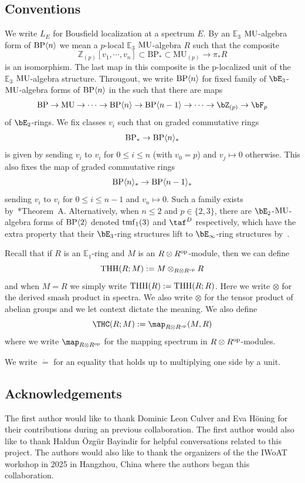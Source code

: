 \subsection{Conventions}
We write $L_{E}$ for Bousfield localization at a spectrum $E$. By an $
\mathbb{E}_{3}$ $\mathrm{MU}$-algebra form of $\mathrm{BP}\langle n\rangle$ we mean a $p$-local $\mathbb{E}_{3}$ $\mathrm{MU}$-algebra $R$ such that
the composite
\[ \mathbb{Z}_{(p)}[v_1,\cdots ,v_n]\subset \mathrm{BP}_*\subset \mathrm{MU}_{(p)}\to \pi_*R
\]
is an isomorphism. The last map in this composite is the p-localized unit of the $\mathbb{E}_3$ $\mathrm{MU}$-algebra
structure. Througout, we write $\mathrm{BP}\langle n\rangle$ for fixed family of $\bE_3$-$\mathrm{MU}$-algebra forms of $\mathrm{BP}\langle n\rangle$ in the such that there are maps
\[
\BP\to \MU \to  \dots \to \BP\langle n\rangle\to  \BP\langle n-1\rangle\to  \dots  \to \bZ_{(p)}\to \bF_{p}
\]
of $\bE_2$-rings. 
We fix classes $v_i$ such that on graded commutative rings
\[
\mathrm{BP}_*\to  \mathrm{BP}\langle n\rangle_*
\]
is given by sending $v_i$ to $v_i$ for $0\le i\le n$ (with $v_0=p$) and $v_j\mapsto 0$ otherwise. 
This also fixes the map of graded commutative rings 
\[  
    \mathrm{BP}\langle n\rangle_*\to  \mathrm{BP}\langle n-1\rangle_*
\]
sending $v_i$ to $v_i$ for $0\le i\le n-1$ and $v_n\mapsto 0$. Such a family exists by~\cite{HW22}*{Theorem~A}. 
Alternatively, when $n\le 2$ and $p\in \{2,3\}$, there are $\bE_2$-$\mathrm{MU}$-algebra forms of $\mathrm{BP}\langle 2\rangle$ denoted $\mathrm{tmf}_1(3)$ and $\taf^{D}$ respectively, which have the extra property that their $\bE_3$-ring structures lift to $\bE_\infty$-ring structures by~\cites{HL10,LN12,LN14,CM15}. 

Recall that if $R$ is an $\mathbb{E}_1$-ring and $M$ is an $R\otimes R^{\mathrm{op}}$-module, then we can define 
\[ 
\operatorname{THH}(R;M):=M\otimes_{R\otimes R^{\mathrm{op}}}R
\]
and when $M=R$ we simply write $\operatorname{THH}(R):=\operatorname{THH}(R;R)$. Here we write $\otimes$ for the derived smash product in spectra. We also write $\otimes$ for the tensor product of abelian groups and we let context dictate the meaning. We also define 
\[ 
\THC(R;M):=\map_{R\otimes R^{\op}}(M,R)
\]
where we write $\map_{R\otimes R^{\op}}$ for the mapping spectrum in $R\otimes R^{\mathrm{op}}$-modules. 

We write $\dot{=}$ for an equality that holds up to multiplying one side by a unit. 

\subsection{Acknowledgements}
The first author would like to thank Dominic Leon Culver and Eva H\"oning for their contributions during an previous collaboration. The first author would also like to thank Haldun \"Ozg\"ur Bayindir for helpful conversations related to this project. The authors would also like to thank the organizers of the the IWoAT workshop in 2025 in Hangzhou, China where the authors began this collaboration. 
